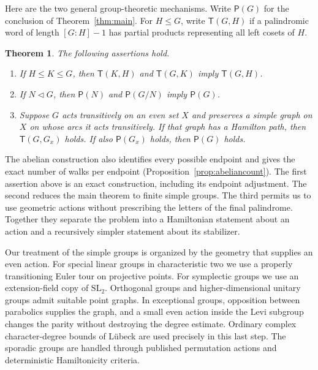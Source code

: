 \documentclass[11pt]{article}
\newtheorem{theorem}{Theorem}[section]
\theoremstyle{definition}
\newcommand{\Pp}{\mathsf P}
\newcommand{\Tt}{\mathsf T}
\newcommand{\SL}{\mathrm{SL}}
\begin{document}
Here are the two general group-theoretic mechanisms. Write $\Pp(G)$ for the conclusion of Theorem~\ref{thm:main}. For $H\le G$, write $\Tt(G,H)$ if a palindromic word of length $[G:H]-1$ has partial products representing all left cosets of $H$.
\begin{theorem}\label{thm:introinterfaces}
The following assertions hold.
\begin{enumerate}
\item If $H\le K\le G$, then $\Tt(K,H)$ and $\Tt(G,K)$ imply $\Tt(G,H)$.
\item If $N\lhd G$, then $\Pp(N)$ and $\Pp(G/N)$ imply $\Pp(G)$.
\item Suppose $G$ acts transitively on an even set $X$ and preserves a simple graph on $X$ on whose arcs it acts transitively. If that graph has a Hamilton path, then $\Tt(G,G_x)$ holds. If also $\Pp(G_x)$ holds, then $\Pp(G)$ holds.
\end{enumerate}
\end{theorem}
The abelian construction also identifies every possible endpoint and gives the exact number of walks per endpoint (Proposition~\ref{prop:abeliancount}). The first assertion above is an exact construction, including its endpoint adjustment. The second reduces the main theorem to finite simple groups. The third permits us to use geometric actions without prescribing the letters of the final palindrome. Together they separate the problem into a Hamiltonian statement about an action and a recursively simpler statement about its stabilizer.

Our treatment of the simple groups is organized by the geometry that supplies an even action. For special linear groups in characteristic two we use a properly transitioning Euler tour on projective points. For symplectic groups we use an extension-field copy of $\SL_2$. Orthogonal groups and higher-dimensional unitary groups admit suitable point graphs. In exceptional groups, opposition between parabolics supplies the graph, and a small even action inside the Levi subgroup changes the parity without destroying the degree estimate. Ordinary complex character-degree bounds of L\"ubeck \cite{Lubeck} are used precisely in this last step. The sporadic groups are handled through published permutation actions and deterministic Hamiltonicity criteria.
\end{document}
